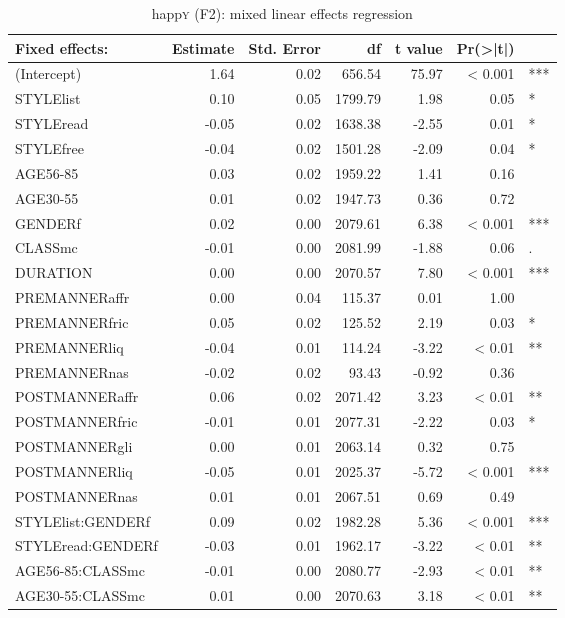 {
	\footnotesize
	\begin{longtable}[c]{p{}rrrrrl}
		\caption{happ\textsc{y} (F2): mixed linear effects regression}\label{tab.regression.happy.f2}\\
		\lsptoprule
		Fixed effects: & Estimate & Std. Error & df & t value & Pr(>|t|) & \\ 
		\midrule{}
		(Intercept) & 1.64 & 0.02 & 656.54 & 75.97 & < 0.001 & *** \\ 
		STYLElist & 0.10 & 0.05 & 1799.79 & 1.98 & 0.05 & *\\ 
		STYLEread & -0.05 & 0.02 & 1638.38 & -2.55 & 0.01 & *\\ 
		STYLEfree & -0.04 & 0.02 & 1501.28 & -2.09 & 0.04 & *\\ 
		AGE56-85 & 0.03 & 0.02 & 1959.22 & 1.41 & 0.16 & \\ 
		AGE30-55 & 0.01 & 0.02 & 1947.73 & 0.36 & 0.72 & \\ 
		GENDERf & 0.02 & 0.00 & 2079.61 & 6.38 & < 0.001 & *** \\ 
		CLASSmc & -0.01 & 0.00 & 2081.99 & -1.88 & 0.06 & .\\ 
		DURATION & 0.00 & 0.00 & 2070.57 & 7.80 & < 0.001 & *** \\ 
		PREMANNERaffr & 0.00 & 0.04 & 115.37 & 0.01 & 1.00 & \\ 
		PREMANNERfric & 0.05 & 0.02 & 125.52 & 2.19 & 0.03 & *\\ 
		PREMANNERliq & -0.04 & 0.01 & 114.24 & -3.22 & < 0.01 & ** \\ 
		PREMANNERnas & -0.02 & 0.02 & 93.43 & -0.92 & 0.36 & \\ 
		POSTMANNERaffr & 0.06 & 0.02 & 2071.42 & 3.23 & < 0.01 & ** \\ 
		POSTMANNERfric & -0.01 & 0.01 & 2077.31 & -2.22 & 0.03 & * \\ 
		POSTMANNERgli & 0.00 & 0.01 & 2063.14 & 0.32 & 0.75 & \\ 
		POSTMANNERliq & -0.05 & 0.01 & 2025.37 & -5.72 & < 0.001 & *** \\ 
		POSTMANNERnas & 0.01 & 0.01 & 2067.51 & 0.69 & 0.49 & \\ 
		STYLElist:GENDERf & 0.09 & 0.02 & 1982.28 & 5.36 & < 0.001 & *** \\ 
		STYLEread:GENDERf & -0.03 & 0.01 & 1962.17 & -3.22 & < 0.01 & ** \\ 
		AGE56-85:CLASSmc & -0.01 & 0.00 & 2080.77 & -2.93 & < 0.01 & ** \\ 
		AGE30-55:CLASSmc & 0.01 & 0.00 & 2070.63 & 3.18 & < 0.01 & ** \\ 

\end{longtable}}

